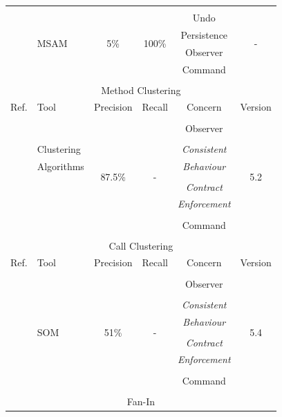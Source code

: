 \begin{table}[!t]
\begin{threeparttable}
\begin{tabular}{|c|l|c|c|c|c|}
\cline{1-6}
&  &  &  &  &  \\
\multirow{4}{*}{\cite{Huang:2010:AMU:1901615.1902239}}&\multirow{4}{*}{MSAM} &\multirow{4}{*}{5\%} & \multirow{4}{*}{100\%}   	          &	 Undo	&\multirow{4}{*}{-} 			\\
& & & & Persistence &\\
& & & & Observer &\\
& & & & Command &\\
&  &  &  &  &  \\
\hline \multicolumn{6}{|c|}{Method Clustering} \\ 
\hline {Ref.} & {Tool} &  {Precision} & {Recall} & {Concern} & {Version} \\
\cline{1-6}
\hline
&  &  &  &  &  \\
\multirow{9}{*}{\cite{cojocar}}&&\multirow{9}{*}{87.5\%}& \multirow{9}{*}{-}&Observer &\multirow{9}{*}{5.2}\\
&   &&& &\\
&  Clustering &&& \textit{Consistent}&\\
&  Algorithms &&& \textit{Behaviour}&\\
&   &&& &\\
&   &&& \textit{Contract}&\\
&   &&& \textit{Enforcement}&\\
&   &&& &\\
&   &&& Command&\\
&  &  &  &  &  \\
\cline{1-6}
\hline \multicolumn{6}{|c|}{Call Clustering} \\ 
\hline {Ref.} & {Tool} &  {Precision} & {Recall} & {Concern} & {Version} \\
\cline{1-6}
&  &  &  &  &  \\
\multirow{9}{*}{\cite{Maisikeli:2009:AMU:1626886}}&\multirow{9}{*}{SOM}&\multirow{9}{*}{51\%}&\multirow{9}{*}{-}&Observer&\multirow{9}{*}{5.4} \\
&   &&& &\\
&  &  &  &\textit{Consistent} &  \\
&  &  &  &\textit{Behaviour}  &  \\
&   &&& &\\
&  &  &  &\textit{Contract}&  \\
&  &  &  &\textit{Enforcement}  &  \\
&   &&& &\\
&  &  &  &Command &  \\
&  &  &  &  &  \\
\cline{1-6}
\hline \multicolumn{6}{|c|}{Fan-In} \\ 

\end{tabular}
\end{threeparttable}
\end{table}
